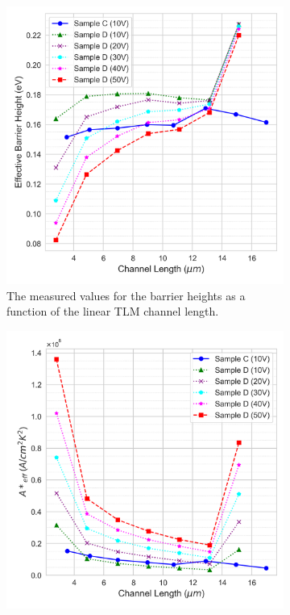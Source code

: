 \begin{figure}[htbp]
    \centering
    \begin{subfigure}[b]{0.49\textwidth}
        \includegraphics[width=\textwidth]{Chapter6/Figs/Raster/barrier_comparison.png}
        \caption{The measured values for the barrier heights as a function of the linear TLM channel length.}
        \label{fig:barrier}
    \end{subfigure}
    \hfill %
    \begin{subfigure}[b]{0.49\textwidth}
        \includegraphics[width=\textwidth]{Chapter6/Figs/Raster/richardson_comparison.png}

\end{subfigure}
\end{figure}
